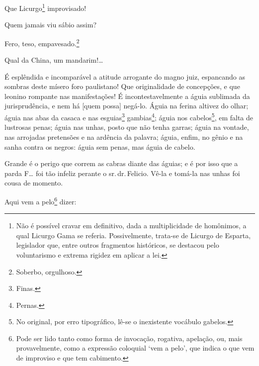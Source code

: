 Que Licurgo\footnote{ Não é possível cravar em definitivo, dada a
  multiplicidade de homônimos, a qual Licurgo Gama se referia.
  Possivelmente, trata-se de Licurgo de Esparta, legislador que, entre
  outros fragmentos históricos, se destacou pelo voluntarismo e extrema
  rigidez em aplicar a lei.} improvisado!

Quem jamais viu sábio assim?

Fero, teso, empavesado.\footnote{ Soberbo, orgulhoso.}

Qual da China, um mandarim!\ldots{}

É esplêndida e incomparável a atitude arrogante do magno juiz,
espancando as sombras deste mísero foro paulistano! Que originalidade de
concepções, e que leonino rompante nas manifestações! É
incontestavelmente a águia sublimada da jurisprudência, e nem há {[}quem
possa{]} negá-lo. Águia na ferina altivez do olhar; águia nas abas da
casaca e nas esguias\footnote{ Finas.} gambias\footnote{ Pernas.};
águia nos cabelos\footnote{ No original, por erro tipográfico, lê-se o
  inexistente vocábulo gabelos.}, em falta de lustrosas penas; águia nas
unhas, posto que não tenha garras; águia na vontade, nas arrojadas
pretensões e na ardência da palavra; águia, enfim, no gênio e na sanha
contra os negros: águia sem penas, mas águia de cabelo.

Grande é o perigo que correm as cabras diante das águias; e é por isso
que a parda F\ldots{} foi tão infeliz perante o sr.\,dr.\,Felicio. Vê-la e
tomá-la nas unhas foi cousa de momento.

Aqui vem a pelo\footnote{ Pode ser lido tanto como forma de invocação,
  rogativa, apelação, ou, mais provavelmente, como a expressão coloquial
  `vem a pelo', que indica o que vem de improviso e que tem cabimento.}
dizer:


